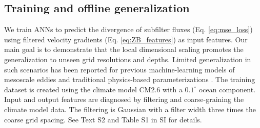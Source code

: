 \documentclass[draft]{agujournal2019}
\begin{document}
\subsection{Training and offline generalization}


We train ANNs to predict the divergence of subfilter fluxes (Eq. \eqref{eq:mse_loss}) using filtered velocity gradients (Eq. \eqref{eq:ZB_features}) as input features. Our main goal is to demonstrate that the local dimensional scaling promotes the generalization to unseen grid resolutions and  depths. Limited generalization in such scenarios has been reported for previous machine-learning models of mesoscale eddies \cite{zhang2023implementation, gultekin2024analysis,ross2022benchmarking} and traditional physics-based parameterizations \cite{yankovsky2024}. The training dataset is created using the climate model CM2.6 \cite{griffies2015impacts} with a $0.1^\circ$ ocean component. Input and output features are diagnosed by filtering and coarse-graining the climate model data. The filtering is Gaussian \cite{grooms2021diffusion} with a filter width three times the coarse grid spacing. See Text S2 and Table S1 in SI for details. %
\end{document}
